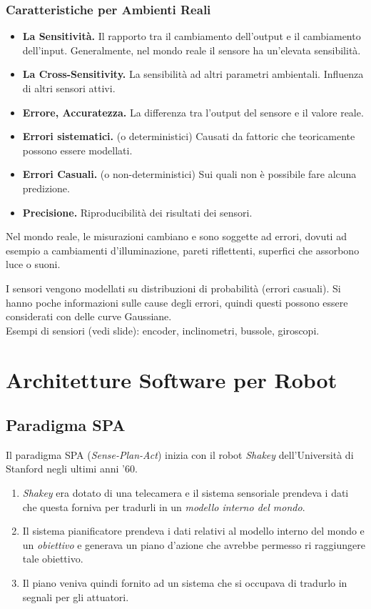 \documentclass[a4paper,portrait,12pt]{article}
\theoremstyle{definition}
\begin{document}
\subsubsection{Caratteristiche per Ambienti Reali}
\begin{itemize}
\item \textbf{La Sensitività.} Il rapporto tra il cambiamento dell'output e il cambiamento dell'input.
Generalmente, nel mondo reale il sensore ha un'elevata sensibilità.
\item \textbf{La Cross-Sensitivity.} La sensibilità ad altri parametri ambientali.
Influenza di altri sensori attivi.
\item \textbf{Errore, Accuratezza.} La differenza tra l'output del sensore e il valore reale.
\item \textbf{Errori sistematici.} (o deterministici) Causati da fattoric che teoricamente possono essere modellati. 
\item \textbf{Errori Casuali.} (o non-deterministici) Sui quali non è possibile fare alcuna predizione.
\item \textbf{Precisione.} Riproducibilità dei risultati dei sensori.
\end{itemize}

Nel mondo reale, le misurazioni cambiano e sono soggette ad errori, dovuti ad esempio a cambiamenti d'illuminazione, pareti riflettenti, superfici che assorbono luce o suoni.

I sensori vengono modellati su distribuzioni di probabilità (errori casuali).
Si hanno poche informazioni sulle cause degli errori, quindi questi possono essere considerati con delle curve Gaussiane.\\

Esempi di sensiori (vedi slide): encoder, inclinometri, bussole, giroscopi.



\section{Architetture Software per Robot}

\subsection{Paradigma SPA}

Il paradigma SPA (\emph{Sense-Plan-Act}) inizia con il robot \emph{Shakey} dell'Università di Stanford negli ultimi anni '60.
\begin{enumerate}
\item \emph{Shakey} era dotato di una telecamera e il sistema sensoriale prendeva i dati che questa forniva per tradurli in un \emph{modello interno del mondo}.
\item Il sistema pianificatore prendeva i dati relativi al modello interno del mondo e un \emph{obiettivo} e generava un piano d'azione che avrebbe permesso ri raggiungere tale obiettivo.
\item Il piano veniva quindi fornito ad un sistema che si occupava di tradurlo in segnali per gli attuatori.
\end{enumerate}
\end{document}
